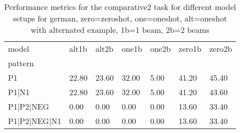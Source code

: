 \begin{table}[h]
\begin{tabular}{l|llllll}
\toprule
model & alt1b & alt2b & one1b & one2b & zero1b & zero2b \\
pattern &  &  &  &  &  &  \\
\midrule
P1 & 22.80 & 23.60 & 32.00 & 5.00 & 41.20 & 45.40 \\
P1|N1 & 22.80 & 23.60 & 32.00 & 5.00 & 41.20 & 43.60 \\
P1|P2|NEG & 0.00 & 0.00 & 0.00 & 0.00 & 13.60 & 33.40 \\
P1|P2|NEG|N1 & 0.00 & 0.00 & 0.00 & 0.00 & 13.60 & 33.40 \\
\bottomrule
\end{tabular}
\caption{Performance metrics for the comparative2 task for different model setups for german, zero=zeroshot, one=oneshot, alt=oneshot with alternated example, 1b=1 beam, 2b=2 beams}
\label{tab:de_comparative2_performance}
\end{table}
